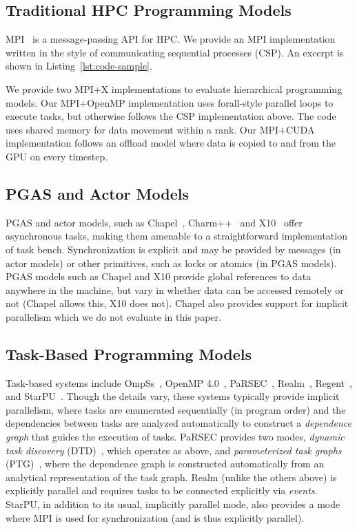 \subsection{Traditional HPC Programming Models}

MPI~\cite{MPI} is a message-passing API for HPC. We provide an MPI
implementation written in the style of communicating sequential
processes (CSP). An excerpt is shown in Listing~\ref{lst:code-sample}.

We provide two MPI+X implementations to evaluate hierarchical
programming models. Our MPI+OpenMP implementation uses forall-style
parallel loops to execute tasks, but otherwise follows the CSP
implementation above. The code uses shared memory for data movement
within a rank. Our MPI+CUDA implementation follows an offload model
where data is copied to and from the GPU on every timestep.

\subsection{PGAS and Actor Models}

PGAS and actor models, such as Chapel~\cite{Chapel15},
Charm++~\cite{Charmpp93} and X10~\cite{X1005} offer
asynchronous tasks, making them amenable to a straightforward
implementation of task bench. Synchronization is explicit and may be
provided by messages (in actor models) or other primitives, such as
locks or atomics (in PGAS models). PGAS models such as Chapel and X10
provide global references to data anywhere in the machine, but vary in
whether data can be accessed remotely or not (Chapel allows this, X10
does not). Chapel also provides support for implicit parallelism which
we do not evaluate in this paper.

\subsection{Task-Based Programming Models}

Task-based systems include OmpSs~\cite{OmpSs11}, OpenMP
4.0~\cite{OpenMPSpec40}, PaRSEC~\cite{PARSEC13, PARSEC_DTD},
Realm~\cite{Realm14}, Regent~\cite{Regent15}, and
StarPU~\cite{StarPU11}. Though the details vary, these systems
typically provide implicit parallelism, where tasks are enumerated
sequentially (in program order) and the dependencies between tasks are
analyzed automatically to construct a \emph{dependence graph} that
guides the execution of tasks. PaRSEC provides two modes,
\emph{dynamic task discovery} (DTD)~\cite{PARSEC_DTD}, which operates
as above, and \emph{parameterized task graphs} (PTG)~\cite{PARSEC13},
where the dependence graph is constructed automatically from an
analytical representation of the task graph. Realm (unlike the others
above) is explicitly parallel and requires tasks to be connected
explicitly via \emph{events}. StarPU, in addition to its usual,
implicitly parallel mode, also provides a mode where MPI is used for
synchronization (and is thus explicitly parallel).

